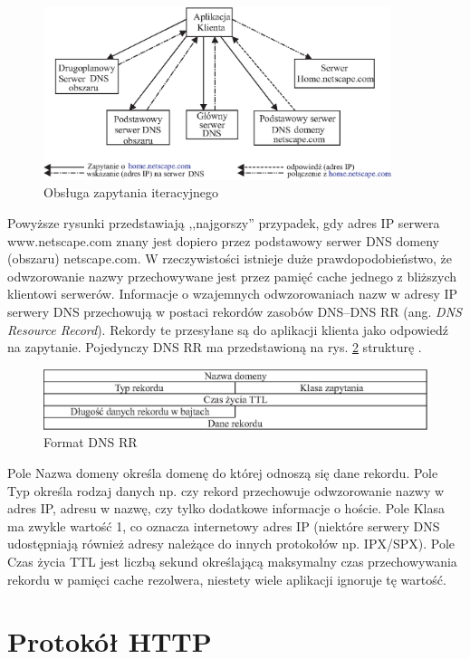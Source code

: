 \begin{figure}[h]
\centering
\includegraphics[width=4in]{./rysunki/zapytanie_iteracyjne.eps}
\caption{Obsługa zapytania iteracyjnego}
\label{iteracyjne}
\end{figure}

Powyższe rysunki przedstawiają ,,najgorszy'' przypadek, gdy adres IP serwera www.netscape.com znany jest dopiero 
przez podstawowy serwer DNS domeny (obszaru) netscape.com. W rzeczywistości istnieje duże prawdopodobieństwo, że 
odwzorowanie nazwy przechowywane jest przez pamięć cache jednego z bliższych klientowi serwerów.
Informacje o wzajemnych odwzorowaniach nazw w adresy IP serwery DNS przechowują w postaci rekordów zasobów 
DNS--DNS RR (ang. \emph{DNS Resource Record}). Rekordy te przesyłane są do aplikacji klienta jako odpowiedź na 
zapytanie. Pojedynczy DNS RR ma przedstawioną na rys. \ref{dns_rr} strukturę \cite{barylo3}.
\begin{figure}[h]
\centering
\includegraphics[width=5in]{./rysunki/format_dns_rr.eps}
\caption{Format DNS RR}
\label{dns_rr}
\end{figure}

Pole Nazwa domeny określa domenę do której odnoszą się dane rekordu. Pole Typ określa rodzaj danych np. czy 
rekord przechowuje odwzorowanie nazwy w adres IP, adresu w nazwę, czy tylko dodatkowe informacje o hoście. Pole 
Klasa ma zwykle wartość 1, co oznacza internetowy adres IP (niektóre serwery DNS udostępniają również adresy 
należące do innych protokołów np. IPX/SPX). Pole Czas życia TTL jest liczbą sekund określającą maksymalny czas 
przechowywania rekordu w pamięci cache rezolwera, niestety wiele aplikacji ignoruje tę wartość.

\section{Protokół HTTP}

